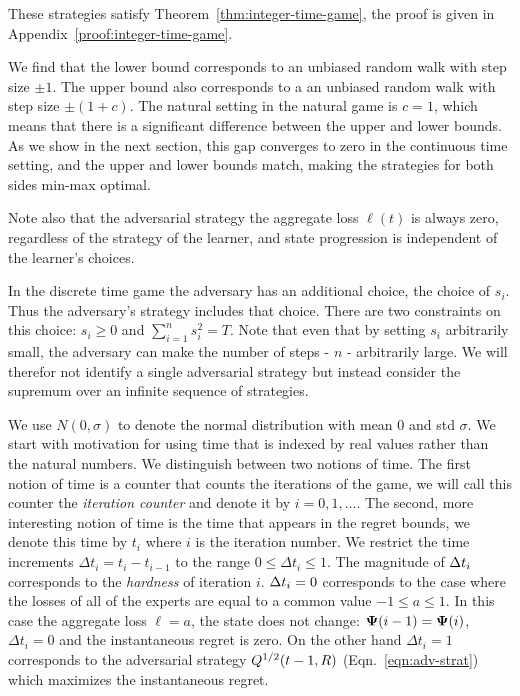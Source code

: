 \documentclass[12pt]{article} %
\begin{document}
These strategies satisfy Theorem~\ref{thm:integer-time-game}, the
proof is given in Appendix~\ref{proof:integer-time-game}.
 
  We find that the lower bound corresponds to an unbiased random
  walk with step size $\pm 1$. The upper bound also corresponds to a an
  unbiased random walk with step size $\pm(1+c)$. The natural setting
  in the natural game is $c=1$, which means that there is a
  significant difference between the upper and lower bounds. As we
  show in the next section, this gap converges to zero in the
  continuous time setting, and the upper and lower bounds match,
  making the strategies for both sides min-max optimal. 

  Note also that the adversarial strategy the aggregate loss
  $\ell(t)$ is always zero, regardless of the strategy of the
  learner, and state progression is independent of the
  learner's choices.


In the discrete time game the adversary has an additional choice, the
choice of $s_i$. Thus the adversary's strategy includes that choice.
There are two constraints on this choice: $s_i \geq 0$ and
$\sum_{i=1}^n s_i^2 = T$. Note that even that by setting $s_i$
arbitrarily small, the adversary can make the number of steps - $n$ -
arbitrarily large. We will therefor not identify a single adversarial
strategy but instead consider the supremum over an infinite sequence
of strategies.

We use $N(0,\sigma)$ to denote the normal distribution with mean 0 and
std $\sigma$.
\iffalse
We start with motivation for using time that is indexed by real
values rather than the natural numbers. We distinguish between two
notions of time. The first notion of time is a counter that
counts the iterations of the game, we will call this counter the {\em
  iteration counter } and denote it by $i=0,1,\ldots$. The second,
more interesting notion of time is the time that appears in the regret
bounds, we denote this time by $t_i$ where $i$ is the iteration
number. We restrict the time increments $\Delta t_i =t_i-t_{i-1}$ to
the range $0\leq \Delta t_i \leq 1$.  The magnitude of $\Delta t_i$
corresponds to the {\em hardness} of iteration $i$. $\Delta t_i=0$
corresponds to the case where the losses of all of the experts are
equal to a common value $-1 \leq a \leq 1$. In this case the aggregate
loss $\ell=a$, the state does not change:
${\bf \Psi}(i-1)={\bf \Psi}(i)$, $\Delta t_i=0$ and the instantaneous regret is zero. On the
other hand $\Delta t_i=1$ corresponds to the adversarial strategy
$Q^{1/2}(t-1,R)$ (Eqn.~\ref{eqn:adv-strat}) which maximizes the
instantaneous regret.
\end{document}
